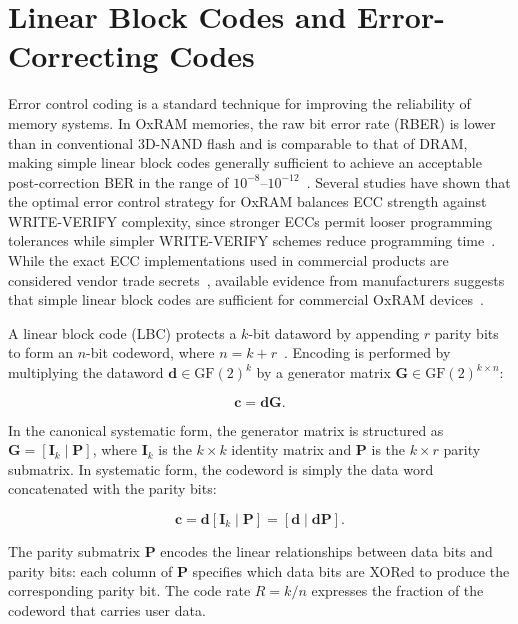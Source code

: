 \section{Linear Block Codes and Error-Correcting Codes}
\label{sec:bg-ecc}

Error control coding is a standard technique for improving the
reliability of memory systems. In OxRAM memories, the raw bit error rate
(RBER) is lower than in conventional 3D-NAND flash and is comparable to
that of DRAM, making simple linear block codes generally sufficient to
achieve an acceptable post-correction BER in the range of
$10^{-8}$--$10^{-12}$~\cite{patel2020bit}. Several studies have shown
that the optimal error control strategy for OxRAM balances ECC strength
against WRITE-VERIFY complexity, since stronger ECCs permit looser
programming tolerances while simpler WRITE-VERIFY schemes reduce
programming time~\cite{hayakawa2017resolving,
	fukuyama2019comprehensive}. While the exact ECC implementations used in
commercial products are considered vendor trade
secrets~\cite{patel2020bit}, available evidence from manufacturers
suggests that simple linear block codes are sufficient for commercial
OxRAM devices~\cite{hayakawa2017resolving}.

A linear block code (LBC) protects a $k$-bit dataword by appending $r$
parity bits to form an $n$-bit codeword, where $n = k +
	r$~\cite{hamming1950error, sklar2004abcs}. Encoding is performed by
multiplying the dataword $\mathbf{d} \in \mathrm{GF}(2)^k$ by a
generator matrix $\mathbf{G} \in \mathrm{GF}(2)^{k \times n}$:

\begin{equation}
	\label{eqn:codeword-gen}
	\mathbf{c} = \mathbf{d}\mathbf{G}.
\end{equation}

In the canonical systematic form, the generator matrix is structured as
$\mathbf{G} = [\mathbf{I}_k \mid \mathbf{P}]$, where $\mathbf{I}_k$ is
the $k \times k$ identity matrix and $\mathbf{P}$ is the $k \times r$
parity submatrix. In systematic form, the codeword is simply the data
word concatenated with the parity bits:

\begin{equation}
	\mathbf{c} = \mathbf{d}[\mathbf{I}_k \mid \mathbf{P}] = [\mathbf{d} \mid \mathbf{d}\mathbf{P}].
\end{equation}

The parity submatrix $\mathbf{P}$ encodes the linear relationships
between data bits and parity bits: each column of $\mathbf{P}$ specifies
which data bits are XORed to produce the corresponding parity bit. The
code rate $R = k/n$ expresses the fraction of the codeword that carries
user data.

